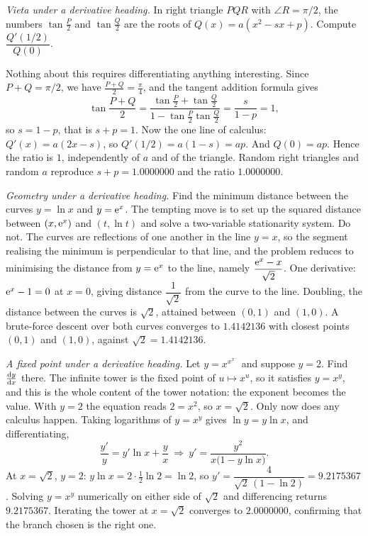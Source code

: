 \begin{worked}
\emph{Vieta under a derivative heading.} In right triangle $PQR$ with $\angle R=\pi/2$, the numbers $\tan\tfrac P2$ and $\tan\tfrac Q2$ are the roots of $Q(x)=a(x^{2}-sx+p)$. Compute $\dfrac{Q'(1/2)}{Q(0)}$.

Nothing about this requires differentiating anything interesting. Since $P+Q=\pi/2$, we have $\tfrac{P+Q}{2}=\tfrac\pi4$, and the tangent addition formula gives
\[
\tan\frac{P+Q}{2}=\frac{\tan\tfrac P2+\tan\tfrac Q2}{1-\tan\tfrac P2\tan\tfrac Q2}=\frac{s}{1-p}=1,
\]
so $s=1-p$, that is $s+p=1$. Now the one line of calculus: $Q'(x)=a(2x-s)$, so $Q'(1/2)=a(1-s)=ap$. And $Q(0)=ap$. Hence the ratio is $1$, independently of $a$ and of the triangle. Random right triangles and random $a$ reproduce $s+p=1.0000000$ and the ratio $1.0000000$.

\emph{Geometry under a derivative heading.} Find the minimum distance between the curves $y=\ln x$ and $y=\mathrm{e}^{x}$. The tempting move is to set up the squared distance between $(x,\mathrm{e}^{x})$ and $(t,\ln t)$ and solve a two-variable stationarity system. Do not. The curves are reflections of one another in the line $y=x$, so the segment realising the minimum is perpendicular to that line, and the problem reduces to minimising the distance from $y=\mathrm{e}^{x}$ to the line, namely $\dfrac{\mathrm{e}^{x}-x}{\sqrt2}$. One derivative: $\mathrm{e}^{x}-1=0$ at $x=0$, giving distance $\dfrac1{\sqrt2}$ from the curve to the line. Doubling, the distance between the curves is $\sqrt2$, attained between $(0,1)$ and $(1,0)$. A brute-force descent over both curves converges to $1.4142136$ with closest points $(0,1)$ and $(1,0)$, against $\sqrt2=1.4142136$.

\emph{A fixed point under a derivative heading.} Let $y=x^{x^{x^{\cdots}}}$ and suppose $y=2$. Find $\frac{\mathrm{d}y}{\mathrm{d}x}$ there. The infinite tower is the fixed point of $u\mapsto x^{u}$, so it satisfies $y=x^{y}$, and this is the whole content of the tower notation: the exponent becomes the value. With $y=2$ the equation reads $2=x^{2}$, so $x=\sqrt2$. Only now does any calculus happen. Taking logarithms of $y=x^{y}$ gives $\ln y=y\ln x$, and differentiating,
\[
\frac{y'}{y}=y'\ln x+\frac{y}{x}\ \Longrightarrow\ y'=\frac{y^{2}}{x\bigl(1-y\ln x\bigr)} .
\]
At $x=\sqrt2$, $y=2$: $y\ln x=2\cdot\tfrac12\ln2=\ln2$, so $y'=\dfrac{4}{\sqrt2\,(1-\ln2)}=9.2175367$. Solving $y=x^{y}$ numerically on either side of $\sqrt2$ and differencing returns $9.2175367$. Iterating the tower at $x=\sqrt2$ converges to $2.0000000$, confirming that the branch chosen is the right one.
\end{worked}


